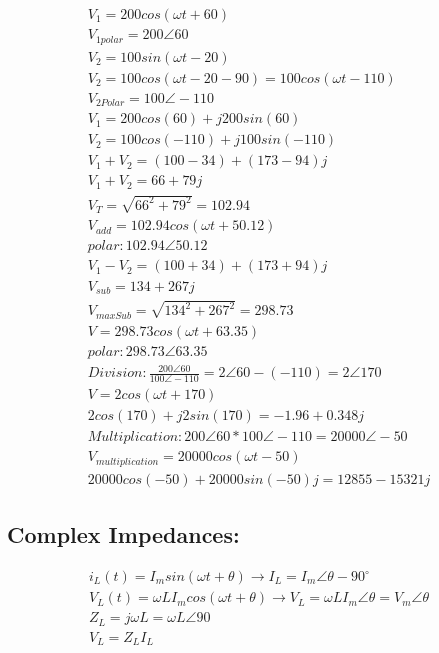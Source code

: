 \documentclass[a4paper,12]{article}
\begin{document}
   \begin{gather}
       V_1=200cos(\omega t+60)\\
       V_{1polar}=200\angle60\\
       V_2=100sin(\omega t-20)\\
       V_2=100cos(\omega t-20-90)=100cos(\omega t-110)\\
       V_{2Polar}=100\angle-110\\
       V_1=200cos(60)+j200sin(60)\\
       V_2=100cos(-110)+j100sin(-110)\\
       V_1+V_2=(100-34)+(173-94)j\\
       \boxed{V_1+V_2=66+79j}\\
       V_T=\sqrt{66^2+79^2}=102.94\\
       \boxed{V_{add}=102.94cos(\omega t+50.12)}\\
       \boxed{polar:102.94\angle 50.12}\\
       V_1-V_2=(100+34)+(173+94)j\\
       \boxed{V_{sub}=134+267j}\\
       V_{maxSub}=\sqrt{134^2+267^2}=298.73\\
       \boxed{V=298.73cos(\omega t+63.35)}\\
       \boxed{polar:298.73\angle 63.35}\\
       \boxed{Division:\frac{200\angle60}{100\angle-110}=2\angle{60-(-110)}=2\angle170}\\
       \boxed{V=2cos(\omega t+170)}\\
       \boxed{2cos(170)+j2sin(170)=-1.96+0.348j}\\
       \boxed{Multiplication:200\angle60*100\angle-110=20000\angle-50}\\
       \boxed{V_{multiplication}=20000cos(\omega t-50)}\\
       \boxed{20000cos(-50)+20000sin(-50)j=12855-15321j}
   \end{gather}
   \subsection{Complex Impedances:}
    \begin{gather}
        i_L(t)=I_m sin(\omega t+\theta)\rightarrow I_L=I_m\angle \theta -90^\circ\\
        V_L(t)=\omega L I_m cos(\omega t+ \theta)\rightarrow V_L=\omega L I_m\angle \theta=V_m\angle \theta\\
        Z_L=j \omega L=\omega L\angle 90\\
        V_L=Z_LI_L
    \end{gather}
\end{document}
